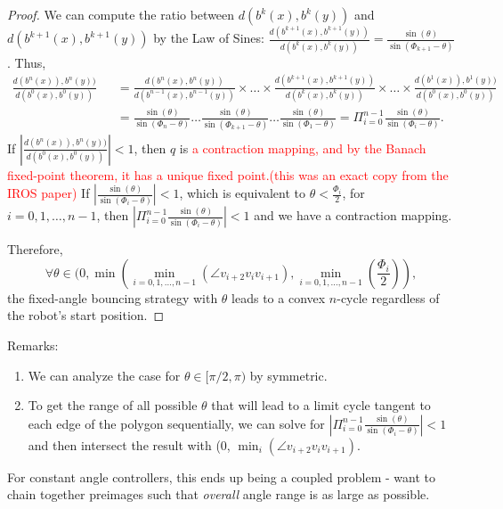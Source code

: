 \documentclass[]{styles/svproc}  %
\begin{document}
\begin{proof}
We can compute the ratio between $d(b^k(x), b^k(y))$ and $d(b^{k+1}(x), b^{k+1}(y))$ by the Law of Sines: $\frac{d(b^{k+1}(x), b^{k+1}(y))}{d(b^{k}(x), b^{k}(y))} = \frac{\sin(\theta)}{\sin(\Phi_{k+1}-\theta)}$.  Thus, \begin{eqnarray*}\frac{d(b^{n}(x)), b^{n}(y))}{d(b^{0}(x), b^{0}(y))} &&= \frac{d(b^{n}(x), b^{n}(y))}{d(b^{n-1}(x), b^{n-1}(y))}\times \dots \times\frac{d(b^{k+1}(x), b^{k+1}(y))}{d(b^{k}(x), b^{k}(y))}\times \dots \times\frac{d(b^{1}(x)), b^{1}(y))}{d(b^{0}(x), b^{0}(y))} \\
&&= \frac{\sin(\theta)}{\sin(\Phi_{n}-\theta)}\dots \frac{\sin(\theta)}{\sin(\Phi_{k+1}-\theta)}\dots \frac{\sin(\theta)}{\sin(\Phi_{1}-\theta)} =\Pi_{i = 0}^{n-1}\frac{\sin(\theta)}{\sin(\Phi_{i}-\theta)}. \end{eqnarray*} If $|\frac{d(b^{n}(x)), b^{n}(y))}{d(b^{0}(x), b^{0}(y))}|<1$, then $q$ is \textcolor{red}{a contraction mapping, and by the Banach fixed-point theorem, it has a unique fixed point.(this was an exact copy from the IROS paper)} If  $|\frac{\sin(\theta)}{\sin(\Phi_{i}-\theta)}|<1$, which is equivalent to $\theta < \frac{\Phi_{i}}{2}$, for $i = 0, 1, \dots, n-1$, then $|\Pi_{i = 0}^{n-1}\frac{\sin(\theta)}{\sin(\Phi_{i}-\theta)}|<1$ and we have a contraction mapping. 

Therefore, \begin{equation*}
\forall \theta \in (0, \min(\min_{i = 0, 1, \dots, n-1}(\angle v_{i+2}v_{i}v_{i+1}), \min_{i = 0, 1, \dots, n-1}(\frac{\Phi_{i}}{2})),\end{equation*} the fixed-angle bouncing strategy with $\theta$ leads to a convex $n$-cycle regardless of the robot's start position.
\end{proof}

Remarks:
\begin{enumerate}
    \item We can analyze the case for $\theta \in [\pi/2, \pi)$ by symmetric.
    \item To get the range of all possible $\theta$ that will lead to a limit cycle tangent to each edge of the polygon sequentially, we can solve for $|\Pi_{i = 0}^{n-1}\frac{\sin(\theta)}{\sin(\Phi_{i}-\theta)}|<1$ and then intersect the result with (0, $\min_{i}(\angle v_{i+2}v_{i}v_{i+1})$.
\end{enumerate}



For constant angle controllers, this
ends up being a coupled problem - want to chain together preimages such that
\emph{overall} angle range is as large as possible.
\end{document}
